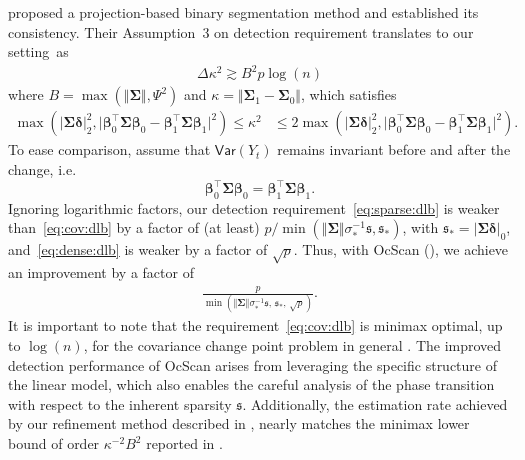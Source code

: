 \documentclass[11pt, a4paper]{article}
\newcommand{\Var}[0]{\mathsf{Var}}
\theoremstyle{definition}
\theoremstyle{definition}
\theoremstyle{definition}
\theoremstyle{definition}
\theoremstyle{definition}
\theoremstyle{remark}
\theoremstyle{definition}
\theoremstyle{definition}
\theoremstyle{definition}
\begin{document}
\citet{wang2021optimal} proposed a projection-based binary segmentation method and established its consistency.
Their Assumption~3 on detection requirement translates to our setting~as %
\begin{align}
\label{eq:cov:dlb}
\Delta \kappa^2 \gtrsim  B^2 p\log(n)
\end{align}
where $B = \max(\Vert \bm\Sigma \Vert, \Psi^2)$ and $\kappa = \Vert \bm\Sigma_1 - \bm\Sigma_0 \Vert$, which satisfies 
\begin{align*}
\max(\vert \bm\Sigma \bm\delta \vert_2^2, \vert \bm\beta_0^\top \bm\Sigma \bm\beta_0 - \bm\beta_1^\top \bm\Sigma \bm\beta_1 \vert^2) \le \kappa^2 &\le 2\max(\vert \bm\Sigma \bm\delta \vert_2^2, \vert \bm\beta_0^\top \bm\Sigma \bm\beta_0 - \bm\beta_1^\top \bm\Sigma \bm\beta_1 \vert^2).
\end{align*}
To ease comparison, assume that $\Var(Y_t)$ remains invariant before and after the change, i.e.\ 
\begin{equation}\label{e:ev}
\bm\beta_0^\top \bm\Sigma \bm\beta_0 = \bm\beta_1^\top \bm\Sigma \bm\beta_1.
\end{equation} 
Ignoring logarithmic factors, our detection requirement~\eqref{eq:sparse:dlb} is weaker than~\eqref{eq:cov:dlb} by a factor of (at least) $p / \min(\Vert \bm\Sigma \Vert \sigma_*^{-1} \mathfrak{s}, \mathfrak{s}_*)$, with $\mathfrak{s}_* = \vert\bm\Sigma \bm\delta\vert_0$, and~\eqref{eq:dense:dlb} is weaker by a factor of $\sqrt{p}$. 
Thus, with OcScan (\Cref{sec:adaptive}), we achieve an improvement by a factor of 
\begin{align*}
\frac{p}{\min(\Vert \bm\Sigma \Vert \sigma_*^{-1} \mathfrak{s}, \, \mathfrak{s}_*, \, \sqrt{p})}.
\end{align*}
It is important to note that the requirement~\eqref{eq:cov:dlb} is minimax optimal, up to $\log(n)$, for the covariance change point problem in general \citep[Lemma~3.1]{wang2021optimal}.
The improved detection performance of OcScan arises from leveraging the specific structure of the linear model, which also enables the careful analysis of the phase transition with respect to the inherent sparsity $\mathfrak{s}$.
Additionally, the estimation rate achieved by our refinement method described in \Cref{sec:refine}, nearly matches the minimax lower bound of order $\kappa^{-2} B^2$ reported in \citet[Lemma~3.2]{wang2021optimal}.
\end{document}
